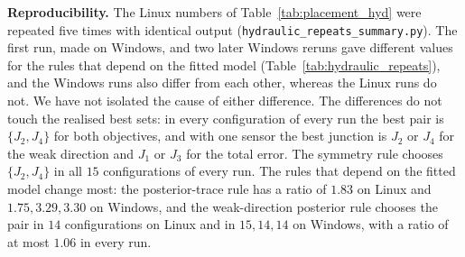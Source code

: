 \documentclass[conference]{IEEEtran}
\begin{document}
\begin{table}[t]
\centering
\caption{Placement rules on EPANET-engine simulations: weak-direction error relative to the best set.}
\label{tab:placement_hyd}
\small
{}
\end{table}

\textbf{Reproducibility.} The Linux numbers of Table~\ref{tab:placement_hyd} were repeated five times with identical output (\texttt{hydraulic\_repeats\_summary.py}). The first run, made on Windows, and two later Windows reruns gave different values for the rules that depend on the fitted model (Table~\ref{tab:hydraulic_repeats}), and the Windows runs also differ from each other, whereas the Linux runs do not. We have not isolated the cause of either difference. The differences do not touch the realised best sets: in every configuration of every run the best pair is $\{J_2,J_4\}$ for both objectives, and with one sensor the best junction is $J_2$ or $J_4$ for the weak direction and $J_1$ or $J_3$ for the total error. The symmetry rule chooses $\{J_2,J_4\}$ in all $15$ configurations of every run. The rules that depend on the fitted model change most: the posterior-trace rule has a ratio of $1.83$ on Linux and $1.75, 3.29, 3.30$ on Windows, and the weak-direction posterior rule chooses the pair in $14$ configurations on Linux and in $15, 14, 14$ on Windows, with a ratio of at most $1.06$ in every run.
\end{document}
